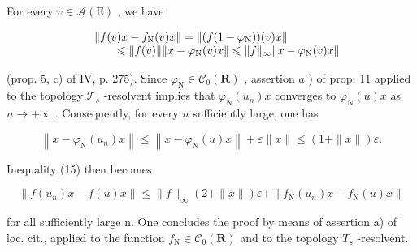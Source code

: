 For every \(v\in \mathcal{A}(\mathrm{E})\) , we have

\[
\begin{array}{r l} & {\| f (v) x - f _ {\mathrm{N}} (v) x \| = \| (f (1 - \varphi_ {\mathrm{N}})) (v) x \|} \\ & {\qquad \leqslant \| f (v) \|   \| x - \varphi_ {\mathrm{N}} (v) x \| \leqslant \| f \| _ {\infty}   \| x - \varphi_ {\mathrm{N}} (v) x \|} \end{array}
\]

(prop. 5, c) of IV, p. 275). Since \(\varphi_{\mathrm{N}} \in \mathcal{C}_0(\mathbf{R})\) , assertion \(a\) ) of prop. 11 applied to the topology \(\mathcal{T}_s\) -resolvent implies that \(\varphi_{\mathrm{N}}(u_n)x\) converges to \(\varphi_{\mathrm{N}}(u)x\) as \(n \to +\infty\) . Consequently, for every \(n\) sufficiently large, one has

\[
\left\| x - \varphi_ {\mathrm{N}} (u _ {n}) x \right\| \leqslant \left\| x - \varphi_ {\mathrm{N}} (u) x \right\| + \varepsilon \| x \| \leqslant (1 + \| x \|) \varepsilon .
\]

Inequality (15) then becomes

\[
\| f (u _ {n}) x - f (u) x \| \leqslant \| f \| _ {\infty} (2 + \| x \|) \varepsilon + \| f _ {\mathrm{N}} (u _ {n}) x - f _ {\mathrm{N}} (u) x \|
\]

for all sufficiently large n. One concludes the proof by means of assertion a) of loc. cit., applied to the function \(f_{\mathrm{N}} \in \mathcal{C}_{0}(\mathbf{R})\) and to the topology \(T_{s}\) -resolvent.

